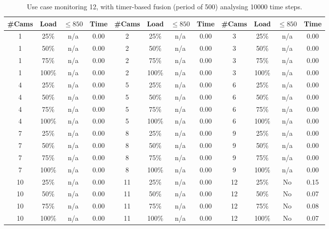 \documentclass{article}
\begin{document}
\begin{table}
\centering
\begin{tabular}{|c|c|c|c|c|c|c|c|c|c|c|c|}
\hline
\#Cams & Load & $\leq 850$ & Time & \#Cams & Load & $\leq 850$ & Time & \#Cams & Load & $\leq 850$ & Time\\
\hline
1 & 25\% & n/a & 0.00 & 2 & 25\% & n/a & 0.00 & 3 & 25\% & n/a & 0.00\\
1 & 50\% & n/a & 0.00 & 2 & 50\% & n/a & 0.00 & 3 & 50\% & n/a & 0.00\\
1 & 75\% & n/a & 0.00 & 2 & 75\% & n/a & 0.00 & 3 & 75\% & n/a & 0.00\\
1 & 100\% & n/a & 0.00 & 2 & 100\% & n/a & 0.00 & 3 & 100\% & n/a & 0.00\\
\hline
4 & 25\% & n/a & 0.00 & 5 & 25\% & n/a & 0.00 & 6 & 25\% & n/a & 0.00\\
4 & 50\% & n/a & 0.00 & 5 & 50\% & n/a & 0.00 & 6 & 50\% & n/a & 0.00\\
4 & 75\% & n/a & 0.00 & 5 & 75\% & n/a & 0.00 & 6 & 75\% & n/a & 0.00\\
4 & 100\% & n/a & 0.00 & 5 & 100\% & n/a & 0.00 & 6 & 100\% & n/a & 0.00\\
\hline
7 & 25\% & n/a & 0.00 & 8 & 25\% & n/a & 0.00 & 9 & 25\% & n/a & 0.00\\
7 & 50\% & n/a & 0.00 & 8 & 50\% & n/a & 0.00 & 9 & 50\% & n/a & 0.00\\
7 & 75\% & n/a & 0.00 & 8 & 75\% & n/a & 0.00 & 9 & 75\% & n/a & 0.00\\
7 & 100\% & n/a & 0.00 & 8 & 100\% & n/a & 0.00 & 9 & 100\% & n/a & 0.00\\
\hline
10 & 25\% & n/a & 0.00 & 11 & 25\% & n/a & 0.00 & 12 & 25\% & No & 0.15\\
10 & 50\% & n/a & 0.00 & 11 & 50\% & n/a & 0.00 & 12 & 50\% & No & 0.07\\
10 & 75\% & n/a & 0.00 & 11 & 75\% & n/a & 0.00 & 12 & 75\% & No & 0.08\\
10 & 100\% & n/a & 0.00 & 11 & 100\% & n/a & 0.00 & 12 & 100\% & No & 0.07\\
\hline
\end{tabular}
\caption{Use case monitoring 12, with timer-based fusion (period of 500) analysing 10000 time steps.}
\end{table}
\end{document}
